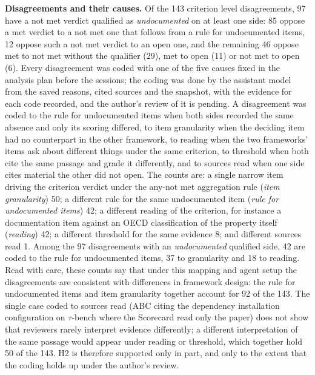 \documentclass[10pt,conference]{IEEEtran}
\begin{document}
\textbf{Disagreements and their causes.} Of the 143 criterion level disagreements, 97 have a not met verdict qualified as \emph{undocumented} on at least one side: 85 oppose a met verdict to a not met one that follows from a rule for undocumented items, 12 oppose such a not met verdict to an open one, and the remaining 46 oppose met to not met without the qualifier (29), met to open (11) or not met to open (6). Every disagreement was coded with one of the five causes fixed in the analysis plan before the sessions; the coding was done by the assistant model from the saved reasons, cited sources and the snapshot, with the evidence for each code recorded, and the author's review of it is pending. A disagreement was coded to the rule for undocumented items when both sides recorded the same absence and only its scoring differed, to item granularity when the deciding item had no counterpart in the other framework, to reading when the two frameworks' items ask about different things under the same criterion, to threshold when both cite the same passage and grade it differently, and to sources read when one side cites material the other did not open. The counts are: a single narrow item driving the criterion verdict under the any-not met aggregation rule (\emph{item granularity}) 50; a different rule for the same undocumented item (\emph{rule for undocumented items}) 42; a different reading of the criterion, for instance a documentation item against an OECD classification of the property itself (\emph{reading}) 42; a different threshold for the same evidence 8; and different sources read 1. Among the 97 disagreements with an \emph{undocumented} qualified side, 42 are coded to the rule for undocumented items, 37 to granularity and 18 to reading. Read with care, these counts say that under this mapping and agent setup the disagreements are consistent with differences in framework design: the rule for undocumented items and item granularity together account for 92 of the 143. The single case coded to sources read (ABC citing the dependency installation configuration on $\tau$-bench where the Scorecard read only the paper) does not show that reviewers rarely interpret evidence differently; a different interpretation of the same passage would appear under reading or threshold, which together hold 50 of the 143. H2 is therefore supported only in part, and only to the extent that the coding holds up under the author's review.
\end{document}
